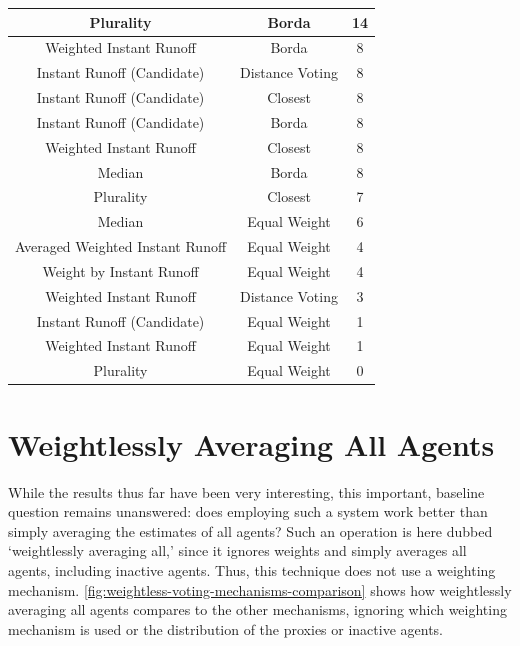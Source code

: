 \begin{table}[htbp]
\begin{tabular}{|c|c|c|}
        \hline
        Plurality                        & Borda               & 14                  \\
        \hline
        Weighted Instant Runoff          & Borda               & 8                   \\
        \hline
        Instant Runoff (Candidate)       & Distance Voting     & 8                   \\
        \hline
        Instant Runoff (Candidate)       & Closest             & 8                   \\
        \hline
        Instant Runoff (Candidate)       & Borda               & 8                   \\
        \hline
        Weighted Instant Runoff          & Closest             & 8                   \\
        \hline
        Median                           & Borda               & 8                   \\
        \hline
        Plurality                        & Closest             & 7                   \\
        \hline
        Median                           & Equal Weight        & 6                   \\
        \hline
        Averaged Weighted Instant Runoff & Equal Weight        & 4                   \\
        \hline
        Weight by Instant Runoff         & Equal Weight        & 4                   \\
        \hline
        Weighted Instant Runoff          & Distance Voting     & 3                   \\
        \hline
        Instant Runoff (Candidate)       & Equal Weight        & 1                   \\
        \hline
        Weighted Instant Runoff          & Equal Weight        & 1                   \\
        \hline
        Plurality                        & Equal Weight        & 0                   \\
        \hline
    \end{tabular}
\end{table}


\section{Weightlessly Averaging All Agents}\label{sec:weightless-average-all}
While the results thus far have been very interesting, this important, baseline
question remains unanswered: does employing such a system work better than simply
averaging the estimates of all agents?
Such an operation is here dubbed `weightlessly averaging all,' since it ignores
weights and simply averages all agents, including inactive agents.
Thus, this technique does not use a weighting mechanism.
\autoref{fig:weightless-voting-mechanisms-comparison} shows how weightlessly
averaging all agents compares to the other mechanisms, ignoring which weighting
mechanism is used or the distribution of the proxies or inactive agents.

